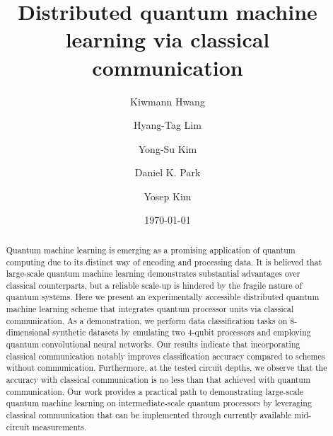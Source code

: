 \documentclass[aps,prx,reprint,amsmath,amssymb,superscriptaddress,nobibnotes,showpacs]{revtex4-2}
\begin{document}
\title{Distributed quantum machine learning via classical communication}


\author{Kiwmann Hwang}
\author{Hyang-Tag Lim}
\author{Yong-Su Kim}
\author{Daniel K. Park}
\author{Yosep Kim}



\date{\today}
\begin{abstract}
Quantum machine learning is emerging as a promising application of quantum computing due to its distinct way of encoding and processing data. It is believed that large-scale quantum machine learning demonstrates substantial advantages over classical counterparts, but a reliable scale-up is hindered by the fragile nature of quantum systems. Here we present an experimentally accessible distributed quantum machine learning scheme that integrates quantum processor units via classical communication. As a demonstration, we perform data classification tasks on 8-dimensional synthetic datasets by emulating two 4-qubit processors and employing quantum convolutional neural networks. Our results indicate that incorporating classical communication notably improves classification accuracy compared to schemes without communication. Furthermore, at the tested circuit depths, we observe that the accuracy with classical communication is no less than that achieved with quantum communication. Our work provides a practical path to demonstrating large-scale quantum machine learning on intermediate-scale quantum processors by leveraging classical communication that can be implemented through currently available mid-circuit measurements.
\end{abstract} 
\maketitle
\end{document}
